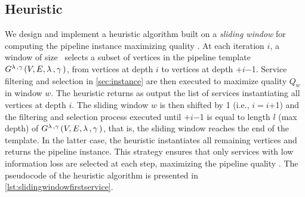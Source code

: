 \subsection{Heuristic}\label{subsec:heuristics}
We design and implement a heuristic algorithm built on a \emph{sliding window} for computing the pipeline instance maximizing quality \q.
At each iteration $i$, a window of size \windowsize\ selects a subset of vertices in the pipeline template $G^{\lambda\,,\gamma\,}(V,E,\lambda\,,\gamma\,)$, from vertices at depth $i$ to vertices at depth \windowsize$+$$i$$-$1.
Service filtering and selection in \cref{sec:instance} are then executed to maximize quality $Q_w$ in window $w$. The heuristic returns as output the list of services instantiating all vertices at depth $i$. The sliding window $w$ is then shifted by 1 (i.e., $i$$=$$i$+1) and the filtering and selection process executed until \windowsize$+$$i$$-$1 is equal to length $l$ (max depth) of $G^{\lambda\,,\gamma\,}(V,E,\lambda\,,\gamma\,)$, that is, the sliding window reaches the end of the template. In the latter case, the heuristic instantiates all remaining vertices and returns the pipeline instance.
This strategy ensures that only services with low information loss are selected at each step, maximizing the pipeline quality \q. The pseudocode of the heuristic algorithm is presented in \cref{lst:slidingwindowfirstservice}.

